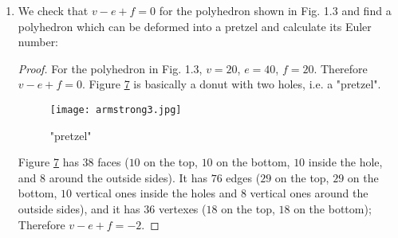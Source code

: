\documentclass{book}
\begin{document}
\begin{enumerate}
\begin{proof}
\begin{figure}
\begin{subfigure}{.5\textwidth}
                    \label{fig:sub1.3}
                \end{subfigure}%
                \begin{subfigure}{.5\textwidth}
                    \centering
                    \texttt{[image: armstrong7.jpg]}
                    \caption{Cube}
                    \label{fig:sub1.4}
                \end{subfigure}
                \begin{subfigure}{.5\textwidth}
                    \centering
                    \texttt{[image: armstrong9.jpg]}
                    \caption{Octahedron}
                    \label{fig:sub1.5}
                \end{subfigure}
                \begin{subfigure}{.5\textwidth}
                    \centering
                    \texttt{[image: armstrong10.jpg]}
                    \caption{Dodecahedron}
                    \label{fig:sub1.6}
                \end{subfigure}
                \begin{subfigure}{.5\textwidth}
                    \centering
                    \texttt{[image: armstrong6.jpg]}
                    \caption{Icosahedron}
                    \label{fig:sub1.7}
                \end{subfigure}
                \label{fig:sub1.8}
                \caption{All five platonic solids.}
            \end{figure}                 
        \end{proof}

    \item We check that $v-e+f=0$ for the polyhedron shown in Fig. 1.3 and find a polyhedron which can be deformed into a pretzel and calculate its Euler number: 
        \begin{proof} For the polyhedron in Fig. 1.3, $v=20$, $e=40$, $f=20$.  Therefore $v-e+f=0$.  Figure \hyperref[fig:sub1.9]{\ref{fig:sub1.9}} is basically a donut with two holes, i.e. a "pretzel". 
            \begin{figure}
                \centering
                \texttt{[image: armstrong3.jpg]}
                \caption{"pretzel"}
                \label{fig:sub1.9}
            \end{figure}%
            \par Figure \hyperref[fig:sub1.9]{\ref{fig:sub1.9}} has $38$ faces ($10$ on the top, $10$ on the bottom, $10$ inside the hole, and $8$ around the outside sides).  It has $76$ edges ($29$ on the top, $29$ on the bottom, $10$ vertical ones inside the holes and $8$ vertical ones around the outside sides), and it has $36$ vertexes ($18$ on the top, $18$ on the bottom); Therefore $v-e+f=-2$.
        \end{proof}


\end{enumerate}
\end{document}
